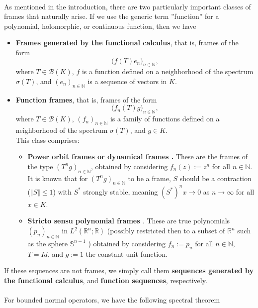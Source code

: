 \documentclass[a4paper,11pt]{article}
\theoremstyle{plain}
\theoremstyle{definition}
\theoremstyle{remark}
\begin{document}
\mbox{} \\
As mentioned in the introduction, there are two particularly important classes of frames that naturally arise. If we use the generic term ''function'' for a polynomial, holomorphic, or continuous function, then we have

\begin{itemize}
    \item[(i)] \textbf{Frames generated by the functional calculus}, that is, frames of the form
    \[
        \big(f(T)e_n\big)_{n\in\mathbb{N}},
    \]
    where $T\in \mathcal{B}(K)$, $f$ is a function defined on a neighborhood of the spectrum $\sigma(T)$, and $(e_n)_{n\in\mathbb{N}}$ is a sequence of vectors in $K$. 
    
    \item[(ii)] \textbf{Function frames}, that is, frames of the form
    \[
        \big(f_n(T)g\big)_{n\in\mathbb{N}},
    \]
    where $T\in \mathcal{B}(K)$, $(f_n)_{n\in\mathbb{N}}$ is a family of functions defined on a neighborhood of the spectrum $\sigma(T)$, and $g\in K$. \\
    This class comprises:
    \begin{itemize}
\item \textbf{Power orbit frames or dynamical frames \cite{AguileraCabrelliNegreiraPaternostro2025, AldroubiCabrelliMolter2014, AldroubiCabrelliMolter2018,BownikSpeegle2015,ChristensenHasannasab2017-1,ChristensenHasannasab2017-2, CabrelliMolterSuarez2024, MartinMedriMolter2021, Philipp2017}.} These are the frames of the type $(T^n g)_{n \in \mathbb{N}}$, obtained by considering $f_n(z) := z^n$ for all $n \in \mathbb{N}$. \\
It is known that for $(T^n g)_{n \in \mathbb{N}}$ to be a frame, $  S  $ should be a contraction ($  \Vert S \Vert \leq 1  $) with $  S^*  $ strongly stable, meaning $  (S^*)^n x \to 0  $ as $  n \to \infty  $ for all $  x \in K  $.
\item \textbf{Stricto sensu polynomial frames \cite{Dai2007, HasannasabKaldeweySchoppert2026,MhaskarNarcowichPrestinWard2000, Schoppert2025, Schoppert2026}}. These are true polynomials $(p_n)_{n \in \mathbb{N}}$ in $L^2(\mathbb{R}^n;\mathbb{R})$ (possibly restricted then to a subset of $\mathbb{R}^n$ such as the sphere $\mathbb{S}^{n-1}$ \cite{Dai2007,MhaskarNarcowichPrestinWard2000}) obtained by considering $f_n := p_n$ for all $n \in \mathbb{N}$, $T = Id$, and $g := 1$ the constant unit function. 
\end{itemize}
\end{itemize}
If these sequences are not frames, we simply call them \textbf{sequences generated by the functional calculus}, and \textbf{function sequences}, respectively. \\ \\
For bounded normal operators, we have the following spectral theorem
\end{document}
